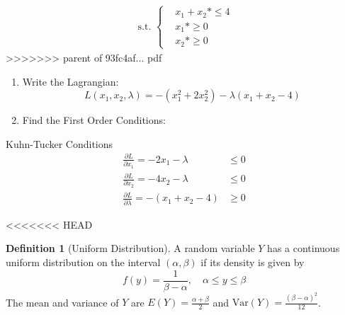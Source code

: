 \documentclass[]{book}
\theoremstyle{definition}
\newtheorem{definition}{Definition}[chapter]
\theoremstyle{definition}
\theoremstyle{definition}
\theoremstyle{remark}
\begin{document}
\begin{align*}
\text{ s.t. } 
\begin{cases}
&x_1 + x_2 *\le 4\\
&x_1 *\ge 0\\
&x_2 *\ge 0
\end{cases}
\end{align*}
>>>>>>> parent of 93fc4af... pdf

\begin{enumerate}
\def\labelenumi{\arabic{enumi}.}
\item
  Write the Lagrangian:
  \[L(x_1, x_2, \lambda) =  -(x_1^2 + 2x_2^2) - \lambda(x_1 + x_2 - 4)\]
\item
  Find the First Order Conditions:
\end{enumerate}

Kuhn-Tucker Conditions
\begin{align*}
\frac{\partial L}{\partial x_1} = -2x_1 - \lambda  &\leq 0\\
\frac{\partial L}{\partial x_2}  = -4x_2 - \lambda & \leq  0\\
\frac{\partial L}{\partial \lambda} = -(x_1 + x_2 - 4)& \geq 0
\end{align*}

<<<<<<< HEAD
\begin{definition}[Uniform Distribution]
\protect\hypertarget{def:unnamed-chunk-91}{}{\label{def:unnamed-chunk-91} {} }A random variable \(Y\) has a continuous uniform distribution on the interval \((\alpha,\beta)\) if its density is given by \[f(y)=\frac{1}{\beta-\alpha}, \quad \alpha\le y\le \beta\] The mean and variance of \(Y\) are \(E(Y)=\frac{\alpha+\beta}{2}\) and \(\text{Var}(Y)=\frac{(\beta-\alpha)^2}{12}\).
\end{definition}
\end{document}
